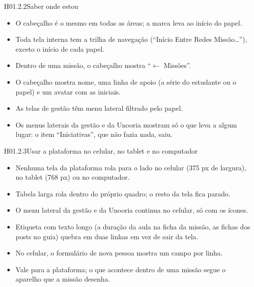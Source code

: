 \begin{historia}{H01.2.2}{Saber onde estou}{\pronto}
\aceite
\begin{itemize}
  \item O cabeçalho é o mesmo em todas as áreas; a marca leva ao início do
    papel.
  \item Toda tela interna tem a trilha de navegação (\enquote{Início \seta{}
    Entre Redes \seta{} Missão\ldots}), exceto o início de cada papel.
  \item Dentro de uma missão, o cabeçalho mostra \enquote{\ensuremath{\leftarrow}
    Missões}.
  \item O cabeçalho mostra nome, uma linha de apoio (a série do estudante ou o
    papel) e um avatar com as iniciais.
  \item As telas de gestão têm menu lateral filtrado pelo papel.
  \item Os menus laterais da gestão e da Unooria mostram só o que leva a algum
    lugar: o item \enquote{Iniciativas}, que não fazia nada, saiu.
\end{itemize}
\end{historia}

\begin{historia}{H01.2.3}{Usar a plataforma no celular, no tablet e no computador}{\pronto}
\aceite
\begin{itemize}
  \item Nenhuma tela da plataforma rola para o lado no celular (375 px de
    largura), no tablet (768 px) ou no computador.
  \item Tabela larga rola dentro do próprio quadro; o resto da tela fica parado.
  \item O menu lateral da gestão e da Unooria continua no celular, só com os
    ícones.
  \item Etiqueta com texto longo (a duração da aula na ficha da missão, as
    fichas dos posts no guia) quebra em duas linhas em vez de sair da tela.
  \item No celular, o formulário de nova pessoa mostra um campo por linha.
  \item Vale para a plataforma; o que acontece dentro de uma missão segue o
    aparelho que a missão desenha.
\end{itemize}
\end{historia}

